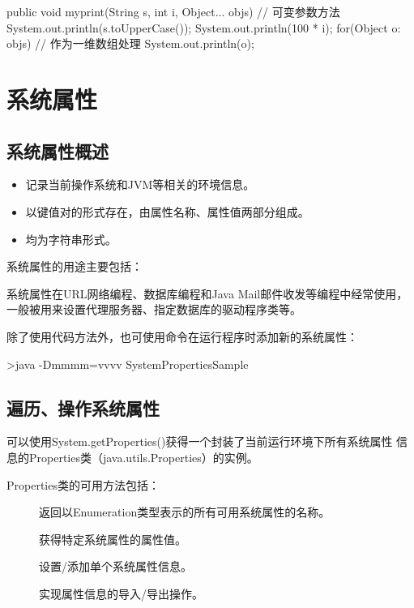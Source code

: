 \begin{javaCode}
  public void myprint(String s, int i, Object... objs) { // 可变参数方法
    System.out.println(s.toUpperCase()); 
    System.out.println(100 * i);
    for(Object o: objs) { // 作为一维数组处理
      System.out.println(o); 
    }
  } 
\end{javaCode}


\section{系统属性}

\subsection{系统属性概述}

\begin{itemize}
\item 记录当前操作系统和JVM等相关的环境信息。
\item 以{\hei\Red 键值对}的形式存在，由{\hei\Red 属性名称、属性值}两部分组成。
\item 均为字符串形式。
\end{itemize}
  
系统属性的用途主要包括：

系统属性在URL网络编程、数据库编程和Java Mail邮件收发等编程中经常使用，
一般被用来设置代理服务器、指定数据库的驱动程序类等。

除了使用代码方法外，也可使用命令在运行程序时添加新的系统属性：
  
\begin{shCode}
  >java -Dmmmm=vvvv SystemPropertiesSample
\end{shCode}

\subsection{遍历、操作系统属性}

可以使用System.getProperties()获得一个封装了当前运行环境下所有系统属性
信息的Properties类（java.utils.Properties）的实例。


Properties类的可用方法包括：

\begin{description}
\item [] 返回以Enumeration类型表示的所有可用系统属性的名称。
\item [] 获得特定系统属性的属性值。
\item [] 设置/添加单个系统属性信息。
\item [] 
\item [] 实现属性信息的导入/导出操作。
\end{description}

